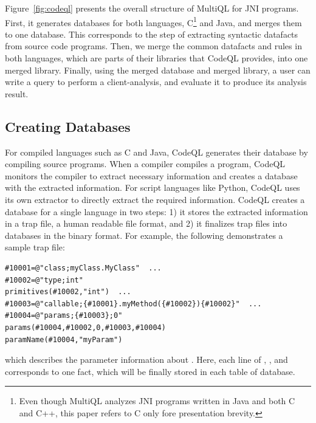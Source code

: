 Figure~\ref{fig:codeql} presents the overall structure of MultiQL for JNI programs.
First, it generates databases for both languages, C\footnote{
Even though MultiQL analyzes JNI programs written in Java and both C and
C++, this paper refers to C only fore presentation brevity.} and
Java, and merges them to one database.  This corresponds
to the step of extracting syntactic datafacts from source code programs.
Then, we merge the common datafacts and rules in both languages,
which are parts of their libraries that CodeQL provides, into one merged library.
Finally, using the merged database and merged library, a user can write a query to
perform a client-analysis, and evaluate it to produce its analysis result.

\subsection{Creating Databases}
For compiled languages such as C and Java, CodeQL generates their database
by compiling source programs.  When a compiler compiles a program,
CodeQL monitors the compiler to extract necessary information and
creates a database with the extracted information. For script languages like Python,
CodeQL uses its own extractor to directly extract the required information.
CodeQL creates a database for a single language in two steps:
1) it stores the extracted information in a trap
file, a human readable file format, and 2) it finalizes trap files
into databases in the binary format. For example, the
following demonstrates a sample trap file:

\begin{lstlisting}[style=java,numbers=none]
#10001=@"class;myClass.MyClass"  ...
#10002=@"type;int"
primitives(#10002,"int")  ...
#10003=@"callable;{#10001}.myMethod({#10002}){#10002}"  ...
#10004=@"params;{#10003};0"
params(#10004,#10002,0,#10003,#10004)
paramName(#10004,"myParam")
\end{lstlisting}
which describes the parameter information about .
Here, each line of ,
, and
corresponds to one fact, which will be
finally stored in each table of database.


